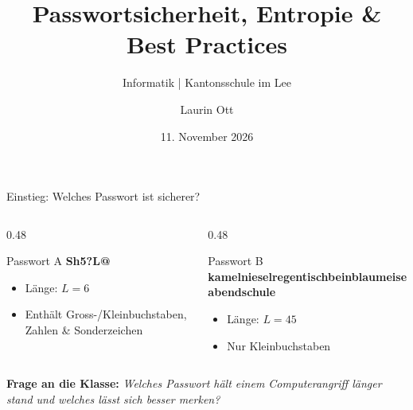 \documentclass[10pt, aspectratio=169]{beamer}
\title[Passwortsicherheit]{Passwortsicherheit, Entropie \& Best Practices}
\subtitle{Informatik | Kantonsschule im Lee}
\author{Laurin Ott}
\date{11. November 2026}
\begin{document}
\begin{frame}
  \titlepage
\end{frame}

\begin{frame}{Einstieg: Welches Passwort ist sicherer?}
  \pause
  \begin{columns}[c]
    \begin{column}{0.48\textwidth}
      \begin{alertblock}{Passwort A}
        \centering \Large \textbf{Sh5?L@}
        \vspace{0.3em}
        \small
        \begin{itemize}
          \item Länge: $L = 6$
          \item Enthält Gross-/Kleinbuchstaben, Zahlen \& Sonderzeichen
        \end{itemize}
      \end{alertblock}
    \end{column}
    \pause
    \begin{column}{0.48\textwidth}
      \begin{exampleblock}{Passwort B}
        \centering \Large \textbf{kamelnieselregentischbeinblaumeiseabendschule}
        \vspace{0.3em}
        \small
        \begin{itemize}
          \item Länge: $L = 45$
          \item Nur Kleinbuchstaben
        \end{itemize}
      \end{exampleblock}
    \end{column}
  \end{columns}
  \pause
  \vspace{1.5em}
  \centering
  \textbf{Frage an die Klasse:} \textit{Welches Passwort hält einem Computerangriff länger stand und welches lässt sich besser merken?}
\end{frame}
\end{document}
